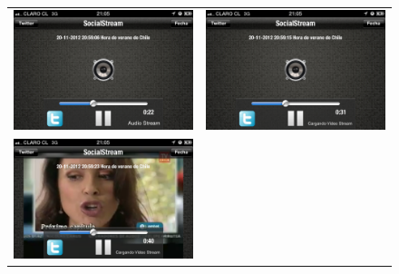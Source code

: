\begin{figure}[H]
	\centering
	\begin{tabular}{cc}
	\includegraphics[scale=0.2]{imgs/cell-link-1.png} & 
	\includegraphics[scale=0.2]{imgs/cell-link-2.png} \\
	\includegraphics[scale=0.2]{imgs/cell-link-3.png} & 

\end{tabular}
\end{figure}
